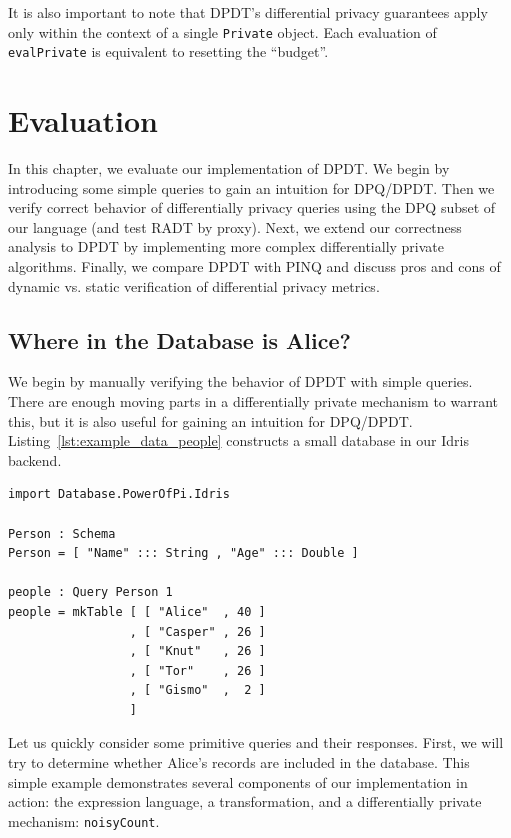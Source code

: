 \documentclass[12pt]{report}
\begin{document}
It is also important to note that DPDT's differential privacy guarantees apply only within the context of a single \texttt{Private} object.
Each evaluation of \texttt{evalPrivate} is equivalent to resetting the ``budget''.

\chapter{Evaluation}\label{sec:evaluation}

In this chapter, we evaluate our implementation of DPDT.
We begin by introducing some simple queries to gain an intuition for DPQ/DPDT.
Then we verify correct behavior of differentially privacy queries using the DPQ subset of our language (and test RADT by proxy).
Next, we extend our correctness analysis to DPDT by implementing more complex differentially private algorithms.
Finally, we compare DPDT with PINQ and discuss pros and cons of dynamic vs. static verification of differential privacy metrics.

\section{Where in the Database is Alice?}

We begin by manually verifying the behavior of DPDT with simple queries.
There are enough moving parts in a differentially private mechanism to warrant this, but it is also useful for gaining an intuition for DPQ/DPDT.
Listing~\ref{lst:example_data_people} constructs a small database in our Idris backend.

\begin{lstlisting}[float,caption={Building an in-memory database},label={lst:example_data_people}]
import Database.PowerOfPi.Idris

Person : Schema
Person = [ "Name" ::: String , "Age" ::: Double ]

people : Query Person 1
people = mkTable [ [ "Alice"  , 40 ]
                 , [ "Casper" , 26 ]
                 , [ "Knut"   , 26 ]
                 , [ "Tor"    , 26 ]
                 , [ "Gismo"  ,  2 ]
                 ]
\end{lstlisting}

Let us quickly consider some primitive queries and their responses.
First, we will try to determine whether Alice's records are included in the database.
This simple example demonstrates several components of our implementation in action: the expression language, a transformation, and a differentially private mechanism: \texttt{noisyCount}.
\end{document}
